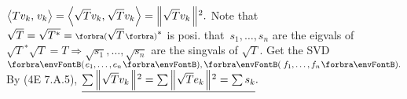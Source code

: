 
$\big\langle{}Tv_k,\;\!v_k{}\big\rangle=\Big\langle{}\sqrt{T}v_k,\:\!\sqrt{T}v_k{}\Big\rangle=\Big\Vert\hspace{1pt}{}\;\!\!\sqrt{T}v_k{}\hspace{1pt}\Big\Vert{\hspace{0.5pt}}{^2}.$ Note that $\sqrt{T}=\sqrt{T^*}=\BigPar{\!\!\:\sqrt{T}}{^*}$ is posi.\parSol{}
\NOTICE that \,$s_1,\dots,s_n$ are the eigvals of $\sqrt{T}{^*}\sqrt{T}=T\Longrightarrow\sqrt{s_1},\dots,\sqrt{s_n}$ are the singvals of $\sqrt{T}.$\vspace{1pt}\parSol{}
Get the SVD $\Par{e_1,\dots,e_n},\Par{\,f_1,\dots,f_n}.$ By (4E 7.A.5), $\uline{\sum\BigDvertsq{\;\!\!\sqrt{T}v_k}=\sum\BigDvertsq{\;\!\!\sqrt{T}e_k}=\sum s_k}.$\PfEnd
\SepLine


